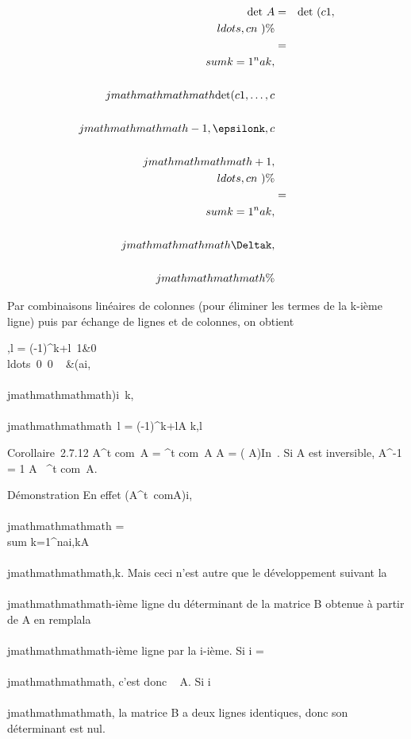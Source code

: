 \begin{align*}
\mathrm{det}~ A& =&
\mathrm{det}~
(c1,\\ldots,cn~)
\%& \\ & =& \\sum
k=1^na k,\\\\jmathmathmathmath \mathrm{det}
(c1,\ldots,c\\\\jmathmathmathmath-1,\epsilonk,c\\\\jmathmathmathmath+1,\\ldots,cn~)\%&
\\ & =& \\sum
k=1^na k,\\\\jmathmathmathmath\Deltak,\\\\jmathmathmathmath \%&
\\ \end{align*}

Par combinaisons linéaires de colonnes (pour éliminer les termes de la
k-ième ligne) puis par échange de lignes et de colonnes, on obtient

\Deltak,l = (-1)^k+l\left
\textbar{}\matrix\,1&0\\ldots~0
\cr \matrix\,0
\cr \⋮~
&(ai,\\\\jmathmathmathmath)i\neq~k,\\\\jmathmathmathmath\mathrel\neq~l\right
\textbar{} = (-1)^k+lA k,l

Corollaire~2.7.12 A^t com~A =
^t com~A A =
( A)In~.
Si A est inversible, A^-1 = 1 \over
{} A~
^t com~A.

Démonstration En effet (A^t\
comA)i,\\\\jmathmathmathmath =\ \\sum
 k=1^nai,kA\\\\jmathmathmathmath,k. Mais ceci n'est
autre que le développement suivant la \\\\jmathmathmathmath-ième ligne du déterminant de la
matrice B obtenue à partir de A en rempla\ccant la
\\\\jmathmathmathmath-ième ligne par la i-ième. Si i = \\\\jmathmathmathmath, c'est donc
\mathrm{det}~ A. Si
i\neq~\\\\jmathmathmathmath, la matrice B a deux lignes identiques,
donc son déterminant est nul.

